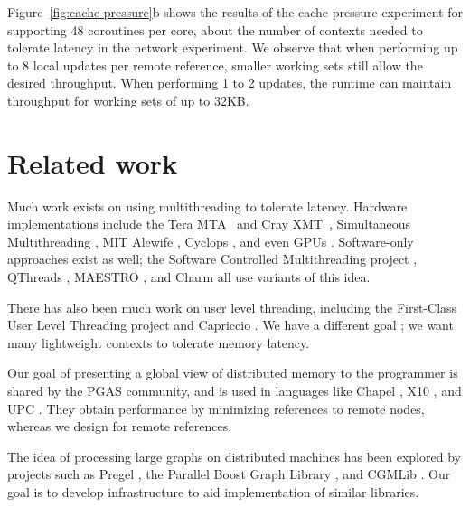 \documentclass[10pt,nocopyrightspace]{sigplanconf}
\newcommand{\mrps}[1]{\unit[#1]{Mref/s}}
\begin{document}
Figure~\ref{fig:cache-pressure}b shows the results of the cache pressure experiment for supporting 48 coroutines per core, about the number of contexts needed to tolerate latency in the network experiment. We observe that when performing up to 8 local updates per remote reference, smaller working sets still allow the desired throughput. When performing 1 to 2 updates, the runtime can maintain throughput for working sets of up to 32KB.



\section{Related work}
\label{sec:related}


Much work exists on using multithreading to tolerate latency. Hardware
implementations include the Tera MTA~\cite{tera} and Cray
XMT~\cite{feo-xmt}, Simultaneous Multithreading \cite{tullsen-smt},
MIT Alewife \cite{agarwal-alewife}, Cyclops \cite{almasi-cyclops}, and
even GPUs \cite{gpus}. Software-only approaches exist as well; the
Software Controlled Multithreading project \cite{mowry-scm}, QThreads
\cite{qthreads}, MAESTRO \cite{maestro}, and Charm \cite{charm} all
use variants of this idea.

There has also been much work on user level threading, including the First-Class
User Level Threading project \cite{ult} and Capriccio \cite{capriccio}. We have a
different goal ; we want many lightweight contexts to tolerate memory
latency.

Our goal of presenting a global view of distributed memory to the
programmer is shared by the PGAS community, and is used in languages
like Chapel \cite{chapel}, X10 \cite{X10}, and UPC \cite{upc}. They
obtain performance by minimizing references to remote nodes, whereas we
design for remote references.

The idea of processing large graphs on distributed machines has been
explored by projects such as Pregel \cite{pregel}, the Parallel Boost
Graph Library \cite{parallelbgl}, and CGMLib \cite{cgmlib}. Our goal
is to develop infrastructure to aid implementation of similar
libraries.
\end{document}
